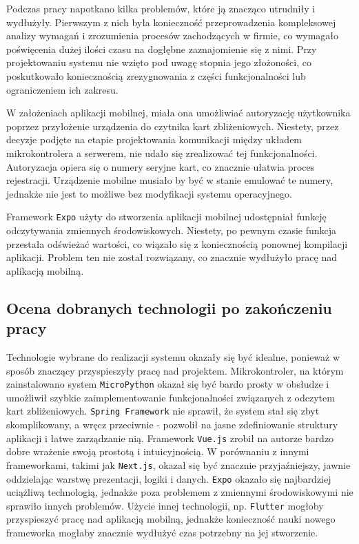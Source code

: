Podczas pracy napotkano kilka problemów, które ją znacząco utrudniły i wydłużyły. Pierwszym z nich była konieczność przeprowadzenia kompleksowej analizy wymagań i zrozumienia procesów zachodzących w firmie, co wymagało poświęcenia dużej ilości czasu na dogłębne zaznajomienie się z nimi. Przy projektowaniu systemu nie wzięto pod uwagę stopnia jego złożoności, co poskutkowało koniecznością zrezygnowania z części funkcjonalności lub ograniczeniem ich zakresu.

W założeniach aplikacji mobilnej, miała ona umożliwiać autoryzację użytkownika poprzez przyłożenie urządzenia do czytnika kart zbliżeniowych. Niestety, przez decyzje podjęte na etapie projektowania komunikacji między układem mikrokontrolera a serwerem, nie udało się zrealizować tej funkcjonalności. Autoryzacja opiera się o numery seryjne kart, co znacznie ułatwia proces rejestracji. Urządzenie mobilne musiało by być w stanie emulować te numery, jednakże nie jest to możliwe bez modyfikacji systemu operacyjnego.

Framework \texttt{Expo} użyty do stworzenia aplikacji mobilnej udostępniał funkcję odczytywania zmiennych środowiskowych. Niestety, po pewnym czasie funkcja przestała odświeżać wartości, co wiązało się z koniecznością ponownej kompilacji aplikacji. Problem ten nie został rozwiązany, co znacznie wydłużyło pracę nad aplikacją mobilną.

\subsection{Ocena dobranych technologii po zakończeniu pracy}

Technologie wybrane do realizacji systemu okazały się być idealne, ponieważ w sposób znaczący przyspieszyły pracę nad projektem. Mikrokontroler, na którym zainstalowano system \texttt{MicroPython} okazał się być bardo prosty w obsłudze i umożliwił szybkie zaimplementowanie funkcjonalności związanych z odczytem kart zbliżeniowych. \texttt{Spring Framework} nie sprawił, że system stał się zbyt skomplikowany, a wręcz przeciwnie - pozwolił na jasne zdefiniowanie struktury aplikacji i łatwe zarządzanie nią. Framework \texttt{Vue.js} zrobił na autorze bardzo dobre wrażenie swoją prostotą i intuicyjnością. W porównaniu z innymi frameworkami, takimi jak \texttt{Next.js}, okazał się być znacznie przyjaźniejszy, jawnie oddzielając warstwę prezentacji, logiki i danych. \texttt{Expo} okazało się najbardziej uciążliwą technologią, jednakże poza problemem z zmiennymi środowiskowymi nie sprawiło innych problemów. Użycie innej technologii, np. \texttt{Flutter} mogłoby przyspieszyć pracę nad aplikacją mobilną, jednakże konieczność nauki nowego frameworka mogłaby znacznie wydłużyć czas potrzebny na jej stworzenie.

